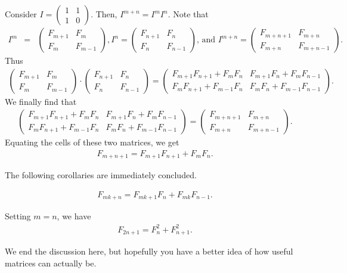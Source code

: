 \documentclass{subfile}
\begin{document}
\begin{solution}
Consider $I=\begin{pmatrix}
1 & 1\\
1 & 0
\end{pmatrix}$. Then, $I^{m+n}=I^mI^n$. Note that
\begin{eqnarray*}
I^m & = &
\begin{pmatrix}
F_{m+1} & F_m\\
F_m & F_{m-1}
\end{pmatrix}, 
I^n  = 
\begin{pmatrix}
F_{n+1} & F_n\\
F_n & F_{n-1}
\end{pmatrix} \text{, and }
 I^{m+n}  =
\begin{pmatrix}
F_{m+n+1} & F_{m+n}\\
F_{m+n} & F_{m+n-1}
\end{pmatrix}.
\end{eqnarray*}
Thus
\begin{align*}
\begin{pmatrix}
F_{m+1} & F_m\\
F_m & F_{m-1}
\end{pmatrix}
\cdot
\begin{pmatrix}
F_{n+1} & F_n\\
F_n & F_{n-1}
\end{pmatrix}=
\begin{pmatrix}
F_{m+1}F_{n+1}+F_mF_n & F_{m+1}F_n+F_mF_{n-1}\\
F_mF_{n+1}+F_{m-1}F_n & F_mF_n+F_{m-1}F_{n-1}
\end{pmatrix}.
\end{align*}
We finally find that
\begin{align*}
\begin{pmatrix}
F_{m+1}F_{n+1}+F_mF_n & F_{m+1}F_n+F_mF_{n-1}\\
F_mF_{n+1}+F_{m-1}F_n & F_mF_n+F_{m-1}F_{n-1}
\end{pmatrix}=
\begin{pmatrix}
F_{m+n+1} & F_{m+n}\\
F_{m+n} & F_{m+n-1}
\end{pmatrix}.
\end{align*}
Equating the cells of these two matrices, we get 
\begin{align*}
F_{m+n+1}=F_{m+1}F_{n+1}+F_mF_n.
\end{align*}
\end{solution}

The following corollaries are immediately concluded.

\begin{corollary}
\begin{align*}
F_{mk+n}=F_{mk+1}F_n+F_{mk}F_{n-1}.
\end{align*}
\end{corollary}

\begin{corollary}
Setting $m=n$, we have
\begin{align*}
F_{2n+1}=F_n^2+F_{n+1}^2.
\end{align*}
\end{corollary}

We end the discussion here, but hopefully you have a better idea of how useful matrices can actually be.
\end{document}
